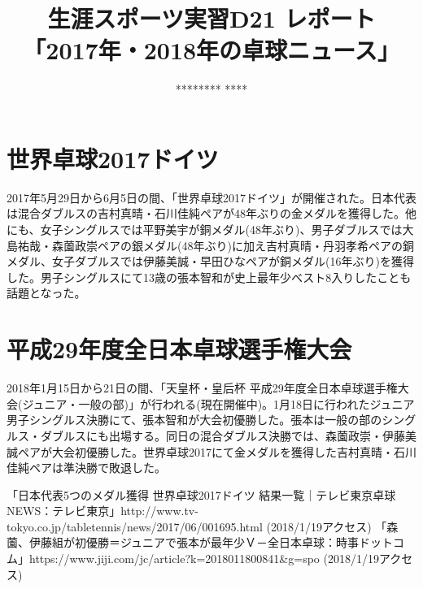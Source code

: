 \documentclass{jsarticle}
\title{生涯スポーツ実習D21 レポート\\「2017年・2018年の卓球ニュース」}
\author{******** ****}
\date{}
\begin{document}
\maketitle

\section{世界卓球2017ドイツ}

2017年5月29日から6月5日の間、「世界卓球2017ドイツ」が開催された。日本代表は混合ダブルスの吉村真晴・石川佳純ペアが48年ぶりの金メダルを獲得した。他にも、女子シングルスでは平野美宇が銅メダル(48年ぶり)、男子ダブルスでは大島祐哉・森薗政崇ペアの銀メダル(48年ぶり)に加え吉村真晴・丹羽孝希ペアの銅メダル、女子ダブルスでは伊藤美誠・早田ひなペアが銅メダル(16年ぶり)を獲得した。男子シングルスにて13歳の張本智和が史上最年少ベスト8入りしたことも話題となった。

\section{平成29年度全日本卓球選手権大会}

2018年1月15日から21日の間、「天皇杯・皇后杯 平成29年度全日本卓球選手権大会(ジュニア・一般の部)」が行われる(現在開催中)。1月18日に行われたジュニア男子シングルス決勝にて、張本智和が大会初優勝した。張本は一般の部のシングルス・ダブルスにも出場する。同日の混合ダブルス決勝では、森薗政崇・伊藤美誠ペアが大会初優勝した。世界卓球2017にて金メダルを獲得した吉村真晴・石川佳純ペアは準決勝で敗退した。

\begin{thebibliography}{1}
   「日本代表5つのメダル獲得 世界卓球2017ドイツ 結果一覧｜テレビ東京卓球NEWS：テレビ東京」http://www.tv-tokyo.co.jp/tabletennis/news/2017/06/001695.html (2018/1/19アクセス)
   「森薗、伊藤組が初優勝＝ジュニアで張本が最年少Ｖ－全日本卓球：時事ドットコム」https://www.jiji.com/jc/article?k=2018011800841\&g=spo (2018/1/19アクセス)
\end{thebibliography}
\end{document}
